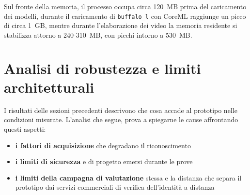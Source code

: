 Sul fronte della memoria, il processo occupa circa 120~MB prima del caricamento dei modelli, durante il caricamento di \texttt{buffalo\_l} con CoreML raggiunge un picco di circa 1~GB, mentre durante l'elaborazione dei video la memoria residente si stabilizza attorno a 240-310~MB, con picchi intorno a 530~MB.

\section{Analisi di robustezza e limiti architetturali}\label{cap:4.4-limiti}
I risultati delle sezioni precedenti descrivono che cosa accade al prototipo nelle condizioni misurate.
L'analisi che segue, prova a spiegarne le cause affrontando questi aspetti:
\begin{itemize}
    \item \textbf{i fattori di acquisizione} che degradano il riconoscimento
    \item \textbf{i limiti di sicurezza} e di progetto emersi durante le prove 
    \item \textbf{i limiti della campagna di valutazione} stessa e la distanza che separa il prototipo dai servizi commerciali di verifica dell'identità a distanza
\end{itemize}


